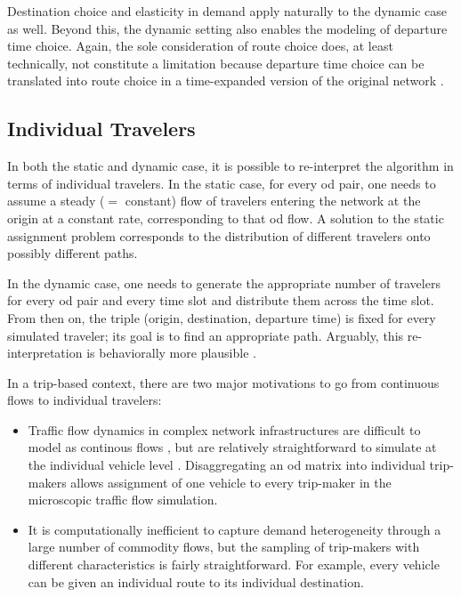 Destination choice and elasticity in demand apply naturally to 
the dynamic case as well. Beyond this, the dynamic setting also enables 
the modeling of departure time choice. Again, the sole consideration 
of route choice does, at least technically, not constitute a limitation\corr{,}{} 
because departure time choice can be translated into route choice in a 
time-expanded version of the original network \citep{vanderzijpp-2001}.


\subsection{Individual Travelers}
\label{sec:indiv-trav}

In both the static and dynamic case, it is possible to
re-interpret the algorithm in terms of individual travelers.  
%
In the static case, for every \gls{od} pair, one needs to
assume a steady ($=$ constant) flow of travelers entering the
network at the origin at a constant rate, corresponding to that \gls{od} flow.
A solution to the static assignment problem corresponds to the
distribution of different travelers onto possibly different paths.

In the dynamic case, one needs to generate the appropriate number of
travelers for every \gls{od} pair and every time slot and distribute them
across the time slot.  From then on, the triple (origin, destination,
departure time) is fixed for every simulated traveler; its goal is
to find an appropriate path.  
%
%
Arguably, this re-interpretation is behaviorally
more plausible .

In a trip-based context, there are two major motivations to go from 
continuous flows to individual travelers:
\begin{itemize}

\item Traffic flow dynamics in complex network infrastructures are 
difficult to model as continous flows 
\citep[e.g.,][]{floetteroed-2011a}, but are relatively straightforward 
to simulate at the individual vehicle level 
\citep[][]{aimsun-www,paramics-www,transmodeler-www,vissim-www,DynusT-nat,zhou-2014}. 
Disaggregating an \gls{od} matrix into individual trip-makers allows
 assignment of one vehicle to every trip-maker in the microscopic
traffic flow simulation.

\item It is computationally inefficient to capture demand heterogeneity 
through a large number of commodity flows, but the sampling of 
trip-makers with different characteristics is fairly straightforward. 
For example, every vehicle can be given an individual route to its individual 
destination.

\end{itemize}

